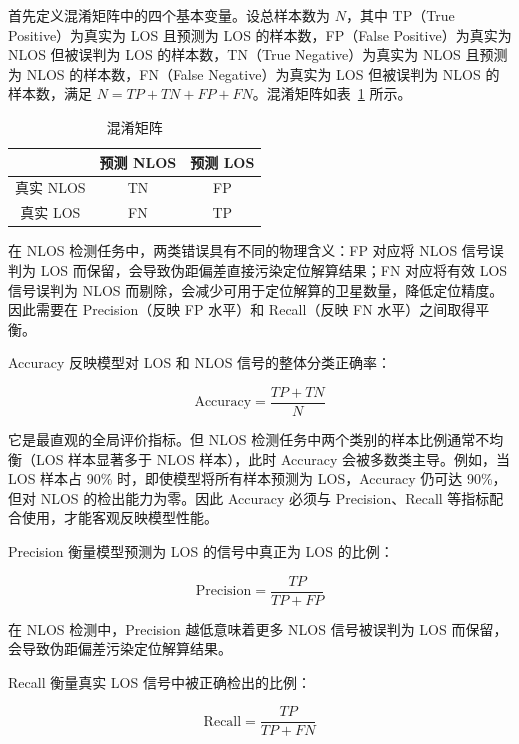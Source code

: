 首先定义混淆矩阵中的四个基本变量。设总样本数为 $N$，其中 TP（True Positive）为真实为 LOS 且预测为 LOS 的样本数，FP（False Positive）为真实为 NLOS 但被误判为 LOS 的样本数，TN（True Negative）为真实为 NLOS 且预测为 NLOS 的样本数，FN（False Negative）为真实为 LOS 但被误判为 NLOS 的样本数，满足 $N = TP + TN + FP + FN$。混淆矩阵如表~\ref{tab:confusion_matrix} 所示。

\begin{table}[htbp]
\centering
\caption{混淆矩阵}
\label{tab:confusion_matrix}
\begin{tabular}{c|cc}
\multicolumn{1}{c|}{} & \multicolumn{1}{c|}{预测 NLOS} & \multicolumn{1}{c}{预测 LOS} \\
\hline
真实 NLOS & TN & FP \\
\hline
真实 LOS & FN & TP \\
\end{tabular}
\end{table}

在 NLOS 检测任务中，两类错误具有不同的物理含义：FP 对应将 NLOS 信号误判为 LOS 而保留，会导致伪距偏差直接污染定位解算结果；FN 对应将有效 LOS 信号误判为 NLOS 而剔除，会减少可用于定位解算的卫星数量，降低定位精度。因此需要在 Precision（反映 FP 水平）和 Recall（反映 FN 水平）之间取得平衡。

Accuracy 反映模型对 LOS 和 NLOS 信号的整体分类正确率：

\begin{equation}
\text{Accuracy} = \dfrac{TP+TN}{N}
\end{equation}

它是最直观的全局评价指标。但 NLOS 检测任务中两个类别的样本比例通常不均衡（LOS 样本显著多于 NLOS 样本），此时 Accuracy 会被多数类主导。例如，当 LOS 样本占 90\% 时，即使模型将所有样本预测为 LOS，Accuracy 仍可达 90\%，但对 NLOS 的检出能力为零。因此 Accuracy 必须与 Precision、Recall 等指标配合使用，才能客观反映模型性能。

Precision 衡量模型预测为 LOS 的信号中真正为 LOS 的比例：

\begin{equation}
\text{Precision} = \dfrac{TP}{TP+FP}
\end{equation}

在 NLOS 检测中，Precision 越低意味着更多 NLOS 信号被误判为 LOS 而保留，会导致伪距偏差污染定位解算结果。

Recall 衡量真实 LOS 信号中被正确检出的比例：

\begin{equation}
\text{Recall} = \dfrac{TP}{TP+FN}
\end{equation}

